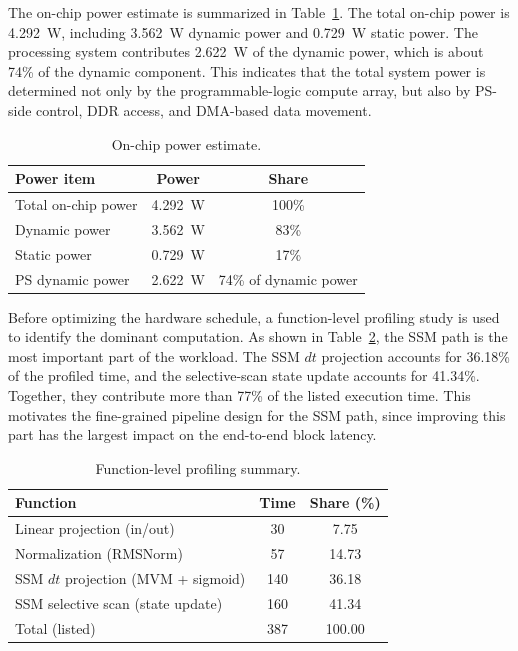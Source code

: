 \documentclass[11pt,twoside]{eitExjobb}
\begin{document}
The on-chip power estimate is summarized in Table~\ref{tab:power_summary}. The total
on-chip power is 4.292~W, including 3.562~W dynamic power and 0.729~W static power. The
processing system contributes 2.622~W of the dynamic power, which is about 74\% of the
dynamic component. This indicates that the total system power is determined not only by
the programmable-logic compute array, but also by PS-side control, DDR access, and
DMA-based data movement.

\begin{table}[H]
\caption{On-chip power estimate.}
\label{tab:power_summary}
\centering
\small
\begin{tabular}{l c c}
\hline
\textbf{Power item} & \textbf{Power} & \textbf{Share} \\
\hline
Total on-chip power & 4.292~W & 100\% \\
Dynamic power & 3.562~W & 83\% \\
Static power & 0.729~W & 17\% \\
PS dynamic power & 2.622~W & 74\% of dynamic power \\
\hline
\end{tabular}
\end{table}

Before optimizing the hardware schedule, a function-level profiling study is used to
identify the dominant computation. As shown in Table~\ref{tab:ssm_profile}, the SSM
path is the most important part of the workload. The SSM \(dt\) projection accounts for
36.18\% of the profiled time, and the selective-scan state update accounts for 41.34\%.
Together, they contribute more than 77\% of the listed execution time. This motivates
the fine-grained pipeline design for the SSM path, since improving this part has the
largest impact on the end-to-end block latency.

\begin{table}[H]
\caption{Function-level profiling summary.}
\label{tab:ssm_profile}
\centering
\scriptsize
\begin{tabular}{l|c|c}
\hline
\textbf{Function} & \textbf{Time} & \textbf{Share (\%)} \\
\hline
Linear projection (in/out)         & 30  & 7.75  \\
Normalization (RMSNorm)            & 57  & 14.73 \\
SSM \(dt\) projection (MVM + sigmoid) & 140 & 36.18 \\
SSM selective scan (state update)  & 160 & 41.34 \\
\hline
Total (listed)                     & 387 & 100.00 \\
\hline
\end{tabular}
\end{table}
\end{document}
